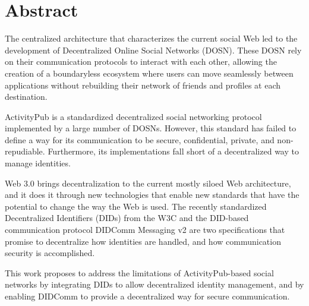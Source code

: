 \chapter*{Abstract}
\label{cha:abstract}

The centralized architecture that characterizes the current social Web led to the development of Decentralized Online Social Networks (DOSN). These DOSN rely on their communication protocols to interact with each other, allowing the creation of a boundaryless ecosystem where users can move seamlessly between applications without rebuilding their network of friends and profiles at each destination.

ActivityPub is a standardized decentralized social networking protocol implemented by a large number of DOSNs. However, this standard has failed to define a way for its communication to be secure, confidential, private, and non-repudiable. Furthermore, its implementations fall short of a decentralized way to manage identities.

Web 3.0 brings decentralization to the current mostly siloed Web architecture, and it does it through new technologies that enable new standards that have the potential to change the way the Web is used. The recently standardized Decentralized Identifiers (DIDs) from the W3C and the DID-based communication protocol DIDComm Messaging v2 are two specifications that promise to decentralize how identities are handled, and how communication security is accomplished.  

This work proposes to address the limitations of ActivityPub-based social networks by integrating DIDs to allow decentralized identity management, and by enabling DIDComm to provide a decentralized way for secure communication.
